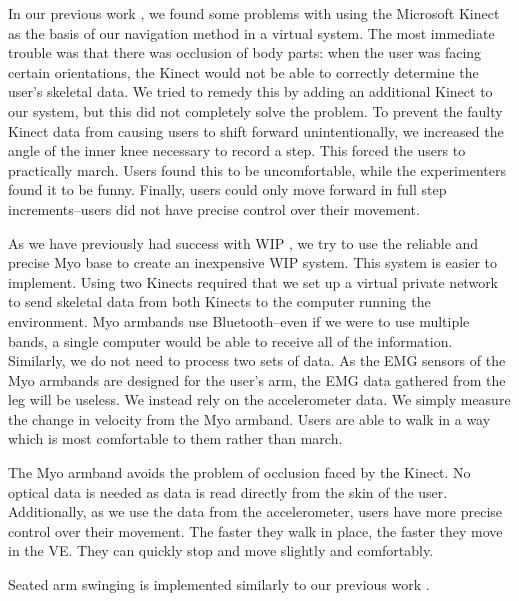 \documentclass{vgtc}                          %
\begin{document}
In our previous work \cite{Wilson:2014}, we found some problems with using the Microsoft Kinect as the basis
of our navigation method in a virtual system.
The most immediate trouble was that there was occlusion of body parts:
when the user was facing certain orientations,
the Kinect would not be able to correctly determine the user's skeletal data.
We tried to remedy this by adding an additional Kinect to our system,
but this did not completely solve the problem.
To prevent the faulty Kinect data from causing users to shift forward unintentionally,
we increased the angle of the inner knee necessary to record a step.
This forced the users to practically march.
Users found this to be uncomfortable, while the experimenters found it to be funny.
Finally, users could only move forward in full step increments--users did not have precise control over their movement.

As we have previously had success with WIP \cite{Williams:2011:EWP},
we try to use the reliable and precise Myo base to create an inexpensive WIP system.
This system is easier to implement.
Using two Kinects required that we set up a virtual private network to send skeletal data from both Kinects
to the computer running the environment.
Myo armbands use Bluetooth--even if we were to use multiple bands,
a single computer would be able to receive all of the information.
Similarly, we do not need to process two sets of data.
As the EMG sensors of the Myo armbands are designed for the user's arm,
the EMG data gathered from the leg will be useless.
We instead rely on the accelerometer data.
We simply measure the change in velocity from the Myo armband.
Users are able to walk in a way which is most comfortable to them rather than march.

The Myo armband avoids the problem of occlusion faced by the Kinect.
No optical data is needed as data is read directly from the skin of the user.
Additionally, as we use the data from the accelerometer,
users have more precise control over their movement.
The faster they walk in place, the faster they move in the VE.
They can quickly stop and move slightly and comfortably.

Seated arm swinging is implemented similarly to our previous work \cite{previousMYO}.
\end{document}
